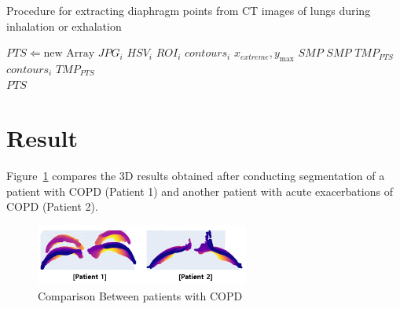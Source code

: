\documentclass[default]{sn-jnl}
\begin{document}
\begin{algorithm}
    \caption{Procedure for extracting diaphragm points from CT images of lungs during inhalation or exhalation}
    \label{algo1}
    \label{alg:extract_points}
    \begin{algorithmic}[1]
        \State $PTS \Leftarrow \text{new Array}$
            \State $JPG_i$ \Leftarrow {}
            \State $HSV_i$ \Leftarrow {}
            \State $ROI_i$ \Leftarrow {}
            \State $contours_i$ \Leftarrow {}
            \State $x_{extreme}, y_{\max}$ \Leftarrow {}
            \State $SMP$ \Leftarrow {}
                \State $SMP$ \Leftarrow {}
            \EndIf
            \State $TMP_{PTS}$ \Leftarrow $ contours_i$
            \State $TMP_{PTS}$ \Leftarrow {}
            \State {}
        \EndFor\\
        \hspace{\algorithmicindent}\Return $PTS$
        \EndProcedure
    \end{algorithmic}
\end{algorithm}


\section{Result}\label{sec:result}

Figure~\ref{fig:3d_comparison} compares the 3D results obtained after conducting segmentation of a patient with COPD
(Patient 1) and another patient with acute exacerbations of COPD (Patient 2).

\begin{figure}[htp]
    \centering
    \includegraphics[width=7cm]{img/3d_comparison}
    \caption{Comparison Between patients with COPD}
    \captionsetup{justification=centering}
    \label{fig:3d_comparison}
\end{figure}
\end{document}
